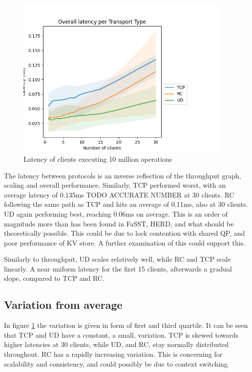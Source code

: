 \begin{figure}
    \centering
    \includegraphics[height=80mm]{figures/PNG/Latency_avg_30}
    \caption{Latency of clients executing 10 million operations}
    \label{fig:latency-30}
\end{figure}

The latency between protocols is an inverse reflection of the throughput graph, scaling and overall performance.
Similarly, TCP performed worst, with an average latency of 0.135ms TODO ACCURATE NUMBER at 30 clients.
RC following the same path as TCP and hits an average of 0.11ms, also at 30 clients.
UD again performing best, reaching 0.06ms on average.
This is an order of magnitude more than has been found in FaSST\cite{kalia2016fasst}, HERD\cite{kalia2014using}, and what should be theoretically possible.
This could be due to lock contention with shared QP, and poor performance of KV store.
A further examination of this could support this.

Similarly to throughput, UD scales relatively well, while RC and TCP scale linearly.
A near uniform latency for the first 15 clients, afterwards a gradual slope, compared to TCP and RC.

\subsection{Variation from average}
In figure \ref{fig:latency-30} the variation is given in form of first and third quartile.
It can be seen that TCP and UD have a constant, a small, variation.
TCP is skewed towards higher latencies at 30 clients, while UD, and RC, stay normally distributed throughout.
RC has a rapidly increasing variation.
This is concerning for scalability and consistency, and could possibly be due to context switching.

